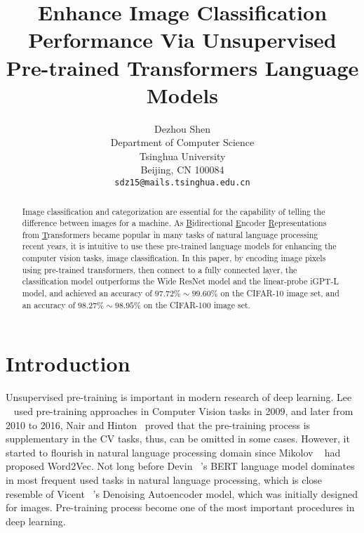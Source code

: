 \documentclass[review]{cvpr}
\begin{document}
\title{Enhance Image Classification Performance Via Unsupervised Pre-trained Transformers Language Models}

\author{Dezhou Shen\\
Department of Computer Science\\
Tsinghua University\\
Beijing, CN 100084\\
{\tt\small sdz15@mails.tsinghua.edu.cn}
}

\maketitle


\begin{abstract}

  Image classification and categorization are essential for the capability of telling the difference between images for a machine.
  As \underline{B}idirectional \underline{E}ncoder \underline{R}epresentations from \underline{T}ransformers became popular in many tasks of natural language processing recent years,
  it is intuitive to use these pre-trained language models for enhancing the computer vision tasks, \eg image classification.
  In this paper, by encoding image pixels using pre-trained transformers, then connect to a fully connected layer,
  the classification model outperforms the Wide ResNet model and the linear-probe iGPT-L model,
  and achieved an accuracy of $97.72\%\sim99.60\%$ on the CIFAR-10 image set, and an accuracy of $98.27\%\sim98.95\%$ on the CIFAR-100 image set.

\end{abstract}

\section{Introduction}

  Unsupervised pre-training is important in modern research of deep learning.
  Lee \etal~\cite{lee2009convolutional} used pre-training approaches
  in Computer Vision tasks in 2009, and later from 2010 to 2016, Nair and Hinton~\cite{nair2010rectified} proved that the pre-training process is supplementary in the CV tasks,
  thus, can be omitted in some cases.
  However, it started to flourish in natural language processing domain since Mikolov \etal~\cite{mikolov2013distributed} had proposed Word2Vec.
  Not long before Devin \etal~\cite{devlin2018bert}'s BERT language model dominates in most frequent used tasks in natural language processing,
  which is close resemble of Vicent \etal~\cite{vincent2008extracting}'s Denoising Autoencoder model, which was initially designed for images.
  Pre-training process become one of the most important procedures in deep learning.
\end{document}
